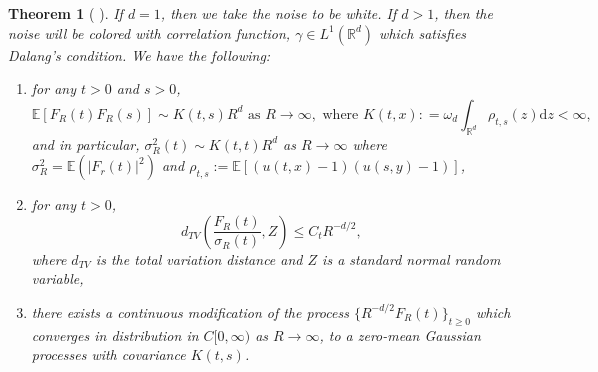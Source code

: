 \documentclass[a4paper,11pt]{article}
\numberwithin{equation}{section}
\theoremstyle{plain}
\newtheorem{theorem}{Theorem}[section]
\theoremstyle{definition}
\newcommand{\ud}{\ensuremath{\mathrm{d} }}
\newcommand{\R}{\mathbb{R}}
\numberwithin{NQ}{section}
\numberwithin{LQ}{section}
\numberwithin{ZQ}{section}
\begin{document}
	\begin{theorem}[ ]
If $d=1$, then we take the noise to be white. If $ d >1$, then the noise will be colored with correlation function, $\gamma \in L^1(\R^d)$ which satisfies Dalang's condition. We have the following:
	\begin{enumerate}
		\item for any $t>0$ and $s>0$,	
			\[
				\mathbb{E}[F_R(t)F_R(s)] \sim K(t,s)R^d \text{ as } R\to \infty, \text{ where } K(t,x): = \omega_d \int_{\R^d} \rho_{t,s}(z) \ud z < \infty,
			\]
			and in particular, $\sigma_R^2(t) \sim K(t,t) R^d$ as $R \to \infty$ where $\sigma_R^2 = \mathbb{E}(|F_r(t)|^2)$ and $\rho_{t,s} := \mathbb{E}\left[ (u(t,x)-1)(u(s,y)-1) \right]$,
		\item for any $t>0$,
			\[
				d_{TV}\left( \frac{F_R(t)}{\sigma_R(t)}, Z \right) \le C_t R^{-d/2},
			\]
		where $d_{TV}$ is the total variation distance and $Z$ is a standard normal random variable,
		\item there exists a continuous modification of the process $\{R^{-d/2}F_R(t)\}_{t \ge 0}$ which converges in distribution in $C[0,\infty)$ as $R \to \infty$, to a zero-mean Gaussian processes with covariance $K(t,s)$.
	\end{enumerate}
	\end{theorem}
\end{document}
